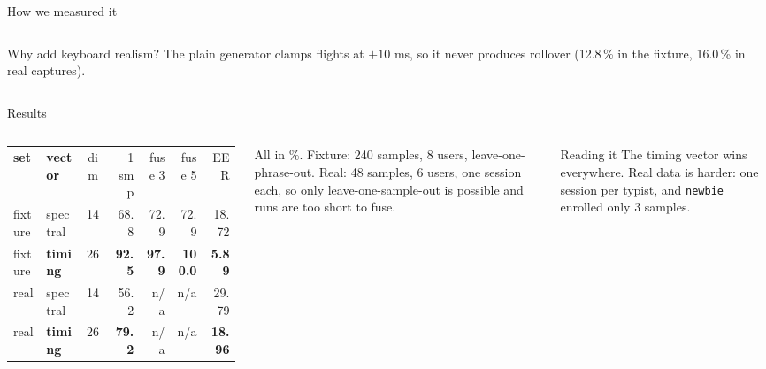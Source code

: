 \documentclass[aspectratio=169,11pt,t]{beamer}
\begin{document}
\begin{frame}{How we measured it}
\begin{columns}[T,onlytextwidth]
\vspace{1.5mm}
\begin{card}[terra]{Why add keyboard realism?}
\scriptsize The plain generator clamps flights at \(+10\) ms, so it never produces rollover (12.8\,\% in the fixture, 16.0\,\% in real captures).
\end{card}
\end{columns}
\end{frame}

\begin{frame}{Results}
\begin{columns}[c,onlytextwidth]
\scriptsize
\renewcommand\arraystretch{1.3}
\begin{tabular}{@{}l l c r r r r@{}}
\rowcolor{ink}
\textcolor{cream}{\bfseries set} & \textcolor{cream}{\bfseries vector} & \textcolor{cream}{dim} & \textcolor{cream}{1 smp} & \textcolor{cream}{fuse 3} & \textcolor{cream}{fuse 5} & \textcolor{cream}{EER}\\
fixture & spectral & 14 & 68.8 & 72.9 & 72.9 & 18.72 \\ \midrule
\rowcolor{terra!12}
fixture & \textbf{timing} & 26 & \textbf{92.5} & \textbf{97.9} & \textbf{100.0} & \textbf{5.89} \\ \midrule
real    & spectral & 14 & 56.2 & n/a & n/a & 29.79 \\ \midrule
\rowcolor{terra!12}
real    & \textbf{timing} & 26 & \textbf{79.2} & n/a & n/a & \textbf{18.96} \\
\end{tabular}

\vspace{2mm}
{\color{muted}All in \%. Fixture: 240 samples, 8 users, leave-one-phrase-out. Real: 48 samples, 6 users, one session each,
so only leave-one-sample-out is possible and runs are too short to fuse.}

\vspace{2mm}
\begin{card}[sky]{Reading it}
\scriptsize The timing vector wins everywhere. Real data is harder: one session per typist, and \texttt{newbie} enrolled only 3 samples.
\end{card}


\end{columns}
\end{frame}
\end{document}
